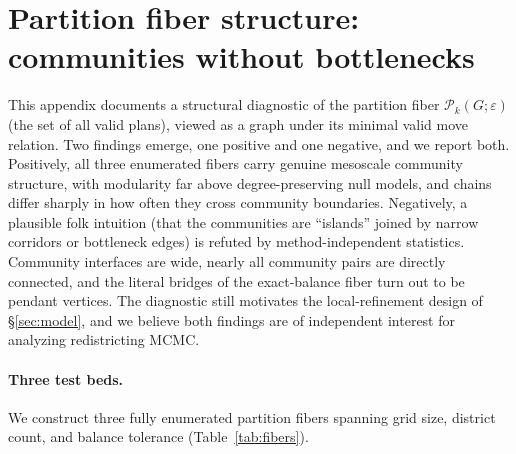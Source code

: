 \documentclass[11pt]{article}
\begin{document}
\section{Partition fiber structure: communities without bottlenecks}\label{sec:fiber-corridors}

This appendix documents a structural diagnostic of the partition fiber
$\mathcal{P}_k(G; \varepsilon)$ (the set of all valid plans), viewed as a graph under its minimal
valid move relation. Two findings emerge, one positive and one
negative, and we report both. Positively, all three enumerated fibers
carry genuine mesoscale community structure, with modularity far above
degree-preserving null models, and chains differ sharply in how often
they cross community boundaries. Negatively, a plausible folk
intuition (that the communities are ``islands'' joined by narrow
corridors or bottleneck edges) is refuted by method-independent
statistics. Community interfaces are wide, nearly all community pairs
are directly connected, and the literal bridges of the exact-balance
fiber turn out to be pendant vertices. The diagnostic still motivates
the local-refinement design of \S\ref{sec:model}, and we believe both
findings are of independent interest for analyzing redistricting
MCMC.

\paragraph{Three test beds.}\label{sec:fiber-testbeds}

We construct three fully enumerated partition fibers spanning grid
size, district count, and balance tolerance (Table~\ref{tab:fibers}).
\end{document}
